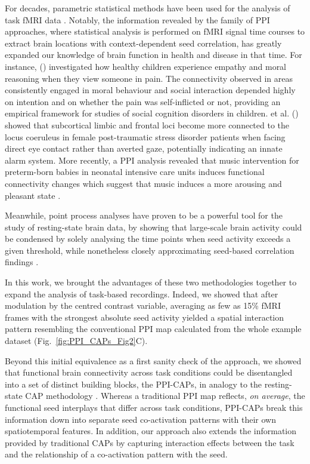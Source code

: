 For decades, parametric statistical methods have  been used for the analysis of task fMRI data \citep{Friston1994,Eklund2016}. Notably, the information revealed by the family of PPI approaches, where statistical analysis is performed on fMRI signal time courses to extract brain locations with context-dependent seed correlation, has greatly expanded our knowledge of brain function in health and disease in that time. For instance, \citeauthor{Decety2008} (\citeyear{Decety2008}) investigated how healthy children experience empathy and moral reasoning when they view someone in pain. The connectivity observed in areas consistently engaged in moral behaviour and social interaction depended highly on intention and on whether the pain was self-inflicted or not, providing an empirical framework for studies of social cognition disorders in children. \citeauthor{Steuwe2015} et al. (\citeyear{Steuwe2015}) showed that subcortical limbic and frontal loci become more connected to the locus coeruleus in female post-traumatic stress disorder patients when facing direct eye contact rather than averted gaze, potentially indicating an innate alarm system. More recently, a PPI analysis revealed that music intervention for preterm-born babies in neonatal intensive care units induces functional connectivity changes which suggest that music induces a more arousing and pleasant state \citep{Lordier2018}.

 
Meanwhile, point process analyses \citep{Tagliazucchi2012} have  proven to be a powerful tool for the study of resting-state brain data, by showing that large-scale brain activity could be condensed by solely analysing the time points when seed activity exceeds a given threshold, while nonetheless closely approximating seed-based correlation findings \citep{Liu2013a}.

In this work, we brought   the advantages of these two methodologies together to expand the analysis of task-based recordings. Indeed, we showed that after modulation by the centred  contrast variable, averaging as few as 15\% fMRI frames with the strongest absolute seed activity yielded a spatial interaction pattern resembling the conventional PPI map calculated from the whole example dataset (Fig.~\ref{fig:PPI_CAPs_Fig2}C). 

Beyond this initial equivalence as a first sanity check of the approach, we showed that functional brain connectivity across task conditions could be disentangled into a set of distinct building blocks, the PPI-CAPs, in analogy to the resting-state CAP methodology \citep{Liu2013,Liu2018}. Whereas a traditional PPI map reflects, \textit{on average}, the functional seed interplays that differ across task conditions, PPI-CAPs break this information down into separate seed co-activation patterns with their own spatiotemporal features. In addition, our approach also extends the information provided by traditional CAPs by capturing interaction effects between the task and the relationship of a co-activation pattern with the seed.

